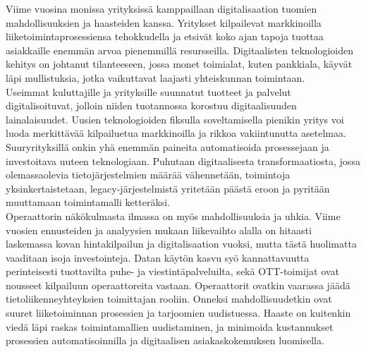 \documentclass[finnish,12pt,a4paper,pdftex]{article}
\begin{document}
\thispagestyle{empty}

Viime vuosina monissa yrityksissä kamppaillaan digitalisaation tuomien mahdollisuuksien ja haasteiden kanssa. Yritykset kilpailevat markkinoilla liiketoimintaprosessiensa tehokkudella ja etsivät koko ajan tapoja tuottaa asiakkaille enemmän arvoa pienemmillä resursseilla. Digitaalisten teknologioiden kehitys on johtanut tilanteeseen, jossa monet toimialat, kuten pankkiala, käyvät läpi mullistuksia, jotka vaikuttavat laajasti yhteiskunnan toimintaan. \citep{jungner}\\

\noindent Useimmat kuluttajille ja yrityksille suunnatut tuotteet ja palvelut digitalisoituvat, jolloin niiden tuotannossa korostuu digitaalisuuden lainalaisuudet. Uusien teknologioiden fiksulla soveltamisella pienikin yritys voi luoda merkittävää kilpailuetua markkinoilla ja rikkoa vakiintunutta asetelmaa. 
Suuryrityksillä onkin yhä enemmän paineita automatisoida prosessejaan ja investoitava uuteen teknologiaan. Puhutaan digitaalisesta transformaatiosta, jossa olemassaolevia tietojärjestelmien määrää vähennetään, toimintoja yksinkertaistetaan, legacy-järjestelmistä yritetään päästä eroon ja pyritään muuttamaan toimintamalli ketteräksi. \citep{lamoureux} \\


\noindent Operaattorin näkökulmasta ilmassa on myös mahdollisuuksia ja uhkia. 
Viime vuosien ennusteiden ja analyysien mukaan liikevaihto alalla on hitaasti laskemassa kovan hintakilpailun ja digitalisaation vuoksi, mutta tästä huolimatta vaaditaan isoja investointeja.
Datan käytön kasvu syö kannattavuutta perinteisesti tuottavilta puhe- ja viestintäpalveluilta, sekä OTT-toimijat ovat nousseet kilpailuun operaattoreita vastaan. Operaattorit ovatkin vaarassa jäädä tietoliikenneyhteyksien toimittajan rooliin. Onneksi mahdollisuudetkin ovat suuret liiketoiminnan prosessien ja tarjoomien uudistuessa. Haaste on kuitenkin viedä läpi raskas toimintamallien uudistaminen, ja minimoida kustannukset prosessien automatisoinnilla ja digitaalisen asiakaskokemuksen luomisella. \citep{mckinseytele}
\end{document}
